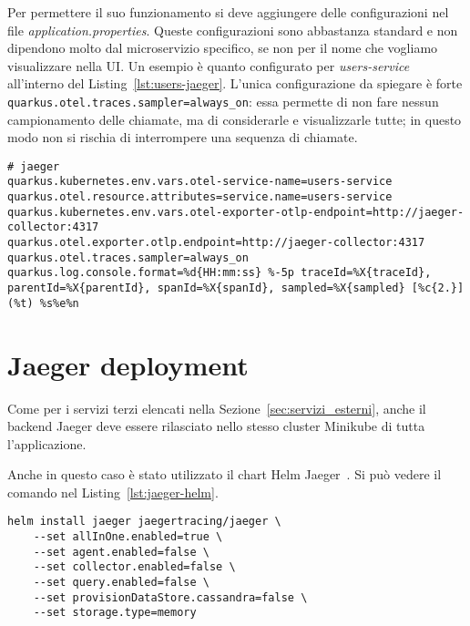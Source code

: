 Per permettere il suo funzionamento si deve aggiungere delle configurazioni nel file \textit{application.properties}. Queste configurazioni sono abbastanza standard e non dipendono molto dal microservizio specifico, se non per il nome che vogliamo visualizzare nella UI. Un esempio è quanto configurato per \textit{users-service} all'interno del Listing~\ref{lst:users-jaeger}. L'unica configurazione da spiegare è forte \texttt{quarkus.otel.traces.sampler=always\_on}: essa permette di non fare nessun campionamento delle chiamate, ma di considerarle e visualizzarle tutte; in questo modo non si rischia di interrompere una sequenza di chiamate.
\begin{lstlisting}[caption=Jaeger configuration for \textit{users-service}, label=lst:users-jaeger]
# jaeger
quarkus.kubernetes.env.vars.otel-service-name=users-service
quarkus.otel.resource.attributes=service.name=users-service
quarkus.kubernetes.env.vars.otel-exporter-otlp-endpoint=http://jaeger-collector:4317
quarkus.otel.exporter.otlp.endpoint=http://jaeger-collector:4317
quarkus.otel.traces.sampler=always_on
quarkus.log.console.format=%d{HH:mm:ss} %-5p traceId=%X{traceId}, parentId=%X{parentId}, spanId=%X{spanId}, sampled=%X{sampled} [%c{2.}] (%t) %s%e%n
\end{lstlisting}

\section{Jaeger deployment}
Come per i servizi terzi elencati nella Sezione~\ref{sec:servizi_esterni}, anche il backend Jaeger deve essere rilasciato nello stesso cluster Minikube di tutta l'applicazione.

Anche in questo caso è stato utilizzato il chart Helm Jaeger~\cite{jaeger_helm}. Si può vedere il comando nel Listing~\ref{lst:jaeger-helm}.
\begin{lstlisting}[caption=Install Jaeger chart for \textit{users-service}, label=lst:jaeger-helm]
helm install jaeger jaegertracing/jaeger \
    --set allInOne.enabled=true \
    --set agent.enabled=false \
    --set collector.enabled=false \
    --set query.enabled=false \
    --set provisionDataStore.cassandra=false \
    --set storage.type=memory
\end{lstlisting}